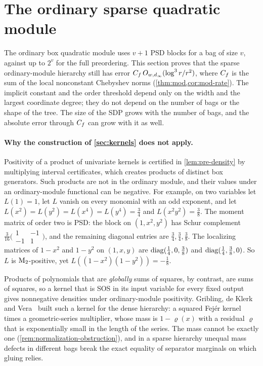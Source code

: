 \section{The ordinary sparse quadratic module}\label{sec:ordinary}

The ordinary box quadratic module uses $v+1$ PSD blocks for a bag of size
$v$, against up to $2^v$ for the full preordering. This section proves that
the sparse ordinary-module hierarchy still has error
$C_f\,O_{w,d_\infty}(\log^3r/r^2)$, where $C_f$ is the sum of the local
nonconstant Chebyshev norms (\cref{thm:mod,cor:mod-rate}). The implicit
constant and the order threshold depend only on the width and the largest
coordinate degree; they do not depend on the number of bags or the shape of
the tree. The size of the SDP grows with the number of bags, and the
absolute error through $C_f$ can grow with it as well.

\paragraph{Why the construction of \cref{sec:kernels} does not apply.}
Positivity of a product of univariate kernels is certified in
\cref{lem:pre-density} by multiplying interval certificates, which creates
products of distinct box generators. Such products are not in the
ordinary module, and their values under an ordinary-module functional can
be negative. For example, on two variables let $L(1)=1$, let $L$ vanish on
every monomial with an odd exponent, and let
$L(x^2)=L(y^2)=L(x^4)=L(y^4)=\tfrac34$ and $L(x^2y^2)=\tfrac38$. The
moment matrix of order two is PSD: the block on $(1,x^2,y^2)$ has Schur
complement $\tfrac3{16}\bigl(\begin{smallmatrix}1&-1\\-1&1\end{smallmatrix}\bigr)$,
and the remaining diagonal entries are $\tfrac34,\tfrac34,\tfrac38$. The
localizing matrices of $1-x^2$ and $1-y^2$ on $(1,x,y)$ are
$\operatorname{diag}(\tfrac14,0,\tfrac38)$ and $\operatorname{diag}(\tfrac14,\tfrac38,0)$. So $L$ is
$\mathrm{M}_2$-positive, yet $L((1-x^2)(1-y^2))=-\tfrac18$.

Products of polynomials that are \emph{globally} sums of squares, by
contrast, are sums of squares, so a kernel that is SOS in its input variable
for every fixed output gives nonnegative densities under ordinary-module
positivity. Gribling, de Klerk and Vera~\cite{gribling2026-squared-kernels}
built such a kernel for the dense hierarchy: a squared Fejér kernel times a
geometric-series multiplier, whose mass is $1-\varrho(x)$ with a residual
$\varrho$ that is exponentially small in the length of the series. The mass
cannot be exactly one (\cref{rem:normalization-obstruction}), and in a
sparse hierarchy unequal mass defects in different bags break the exact
equality of separator marginals on which gluing relies.

